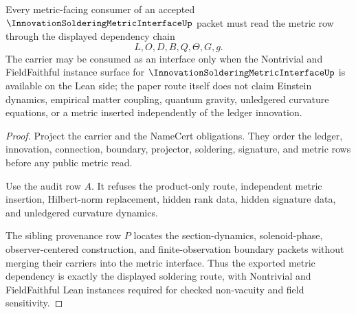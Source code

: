 \begin{theorem}
\label{thm:innovation-soldering-metric-interface-metric-dependency}
Every metric-facing consumer of an accepted $\InnovationSolderingMetricInterfaceUp$ packet must read the metric row through the displayed dependency chain
$$
L,O,D,B,Q,\Theta,G,g .
$$
The carrier may be consumed as an interface only when the Nontrivial and FieldFaithful instance surface for $\InnovationSolderingMetricInterfaceUp$ is available on the Lean side; the paper route itself does not claim Einstein dynamics, empirical matter coupling, quantum gravity, unledgered curvature equations, or a metric inserted independently of the ledger innovation.
\end{theorem}
\begin{proof}
Project the carrier and the NameCert obligations. They order the ledger, innovation, connection, boundary, projector, soldering, signature, and metric rows before any public metric read.

Use the audit row $A$. It refuses the product-only route, independent metric insertion, Hilbert-norm replacement, hidden rank data, hidden signature data, and unledgered curvature dynamics.

The sibling provenance row $P$ locates the section-dynamics, solenoid-phase, observer-centered construction, and finite-observation boundary packets without merging their carriers into the metric interface. Thus the exported metric dependency is exactly the displayed soldering route, with Nontrivial and FieldFaithful Lean instances required for checked non-vacuity and field sensitivity.
\end{proof}




